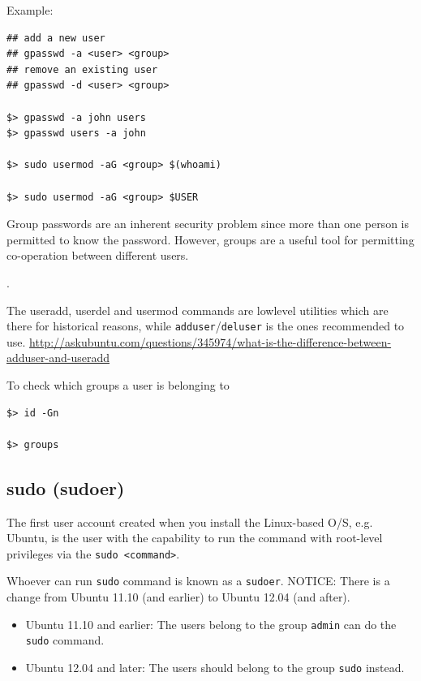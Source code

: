 \begin{itemize}
Example:
\begin{verbatim}
## add a new user
## gpasswd -a <user> <group>
## remove an existing user
## gpasswd -d <user> <group>

$> gpasswd -a john users 
$> gpasswd users -a john

$> sudo usermod -aG <group> $(whoami)

$> sudo usermod -aG <group> $USER
\end{verbatim}

  Group passwords are an inherent security problem since more than one
  person is permitted to know the password. However, groups are a useful
  tool for permitting co-operation between different users.

\end{itemize}. 

The useradd, userdel and usermod commands are lowlevel utilities which are there
for historical reasons, while \verb!adduser!/\verb!deluser! is the ones
recommended to use.
\url{http://askubuntu.com/questions/345974/what-is-the-difference-between-adduser-and-useradd}

To check which groups a user is belonging to
\begin{verbatim}
$> id -Gn

$> groups
\end{verbatim}

\subsection{sudo (sudoer)}
\label{sec:sudo}

The first user account created when you install the Linux-based O/S, e.g.
Ubuntu, is the user with the capability to run the command with root-level
privileges via the \verb!sudo <command>!. 

Whoever can run \verb!sudo! command is known as a \verb!sudoer!. 
NOTICE: There is a change from Ubuntu 11.10 (and earlier) to Ubuntu 12.04 (and
after). 

\begin{itemize}
  \item Ubuntu 11.10 and earlier: The users belong to the group \verb!admin! can
  do the \verb!sudo! command.
 
  \item Ubuntu 12.04 and later: The users should belong to the group \verb!sudo!
  instead.
\end{itemize}

